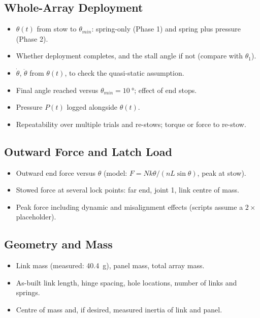 \documentclass[11pt]{article}
\begin{document}
\subsection{Whole-Array Deployment}
\label{sec:array}
\begin{itemize}[noitemsep]
    \item $\theta(t)$ from stow to $\theta_{min}$: spring-only (Phase 1) and spring plus pressure (Phase 2).
    \item Whether deployment completes, and the stall angle if not (compare with $\theta_1$).
    \item $\dot\theta$, $\ddot\theta$ from $\theta(t)$, to check the quasi-static assumption.
    \item Final angle reached versus $\theta_{min}=\SI{10}{\degree}$; effect of end stops.
    \item Pressure $P(t)$ logged alongside $\theta(t)$.
    \item Repeatability over multiple trials and re-stows; torque or force to re-stow.
\end{itemize}

\subsection{Outward Force and Latch Load}
\label{sec:force}
\begin{itemize}[noitemsep]
    \item Outward end force versus $\theta$ (model: $F=N k\theta/(nL\sin\theta)$, peak at stow).
    \item Stowed force at several lock points: far end, joint 1, link centre of mass.
    \item Peak force including dynamic and misalignment effects (scripts assume a $2\times$ placeholder).
\end{itemize}

\subsection{Geometry and Mass}
\begin{itemize}[noitemsep]
    \item Link mass (measured: \SI{40.4}{g}), panel mass, total array mass.
    \item As-built link length, hinge spacing, hole locations, number of links and springs.
    \item Centre of mass and, if desired, measured inertia of link and panel.
\end{itemize}
\end{document}
